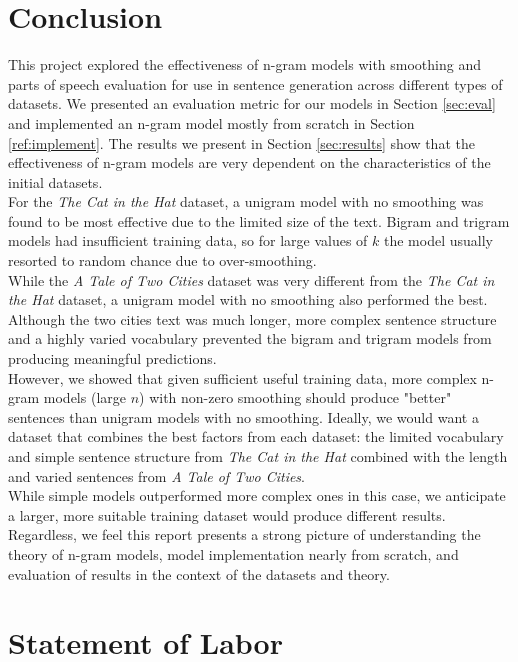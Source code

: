 \documentclass[11pt]{article}
\begin{document}
\section{Conclusion}

This project explored the effectiveness of n-gram models with smoothing and parts of speech evaluation for use in sentence generation across different types of datasets.  We presented an evaluation metric for our models in Section \ref{sec:eval} and implemented an n-gram model mostly from scratch in Section \ref{ref:implement}. The results we present in Section \ref{sec:results} show that the effectiveness of n-gram models are very dependent on the characteristics of the initial datasets.\\

For the \textit{The Cat in the Hat} dataset, a unigram model with no smoothing was found to be most effective due to the limited size of the text.  Bigram and trigram models had insufficient training data, so for large values of $k$ the model usually resorted to random chance due to over-smoothing.\\

While the \textit{A Tale of Two Cities} dataset was very different from the \textit{The Cat in the Hat} dataset, a unigram model with no smoothing also performed the best.  Although the two cities text was much longer, more complex sentence structure and a highly varied vocabulary prevented the bigram and trigram models from producing meaningful predictions.\\

However, we showed that given sufficient useful training data, more complex n-gram models (large $n$) with non-zero smoothing should produce "better" sentences than unigram models with no smoothing.  Ideally, we would want a dataset that combines the best factors from each dataset: the limited vocabulary and simple sentence structure from \textit{The Cat in the Hat} combined with the length and varied sentences from \textit{A Tale of Two Cities}.\\

While simple models outperformed more complex ones in this case, we anticipate a larger, more suitable training dataset would produce different results.  Regardless, we feel this report presents a strong picture of understanding the theory of n-gram models, model implementation nearly from scratch, and evaluation of results in the context of the datasets and theory.

\newpage
\section{Statement of Labor}
\end{document}

